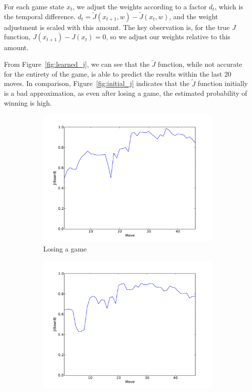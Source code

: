 \documentclass[11pt]{article}
\begin{document}
For each game state $x_t$, we adjust the weights according to a factor $d_t$,
which is the temporal difference. $d_t = \tilde{J}(x_{t+1},w) -
\tilde{J}(x_t,w)$, and the weight adjustment is scaled with this amount. The
key observation is, for the true $J$ function, $J(x_{t+1}) - J(x_t) = 0$, so
we adjust our weights relative to this amount.

From Figure~\ref{fig:learned_j}, we can see that the
$\tilde{J}$ function, while not accurate for the entirety of the game, is able
to predict the results within the last 20 moves. In comparison,
Figure~\ref{fig:initial_j} indicates that the $\tilde{J}$ function
initially is a bad approximation, as even after losing a game, the estimated
probability of winning is high.

\begin{figure}[htbp]
  \begin{subfigure}{0.45\textwidth}
    \centering
    \includegraphics[width=\linewidth]{../Graphs/J_improved_1iteration_lost.pdf}
    \caption{Losing a game}
    \label{fig:initial_j_lost}
  \end{subfigure}
  \hspace{1em}
  \begin{subfigure}{0.45\textwidth}
    \centering
    \includegraphics[width=\linewidth]{../Graphs/J_improved_1iteration_won.pdf}

\end{subfigure}
\end{figure}
\end{document}
